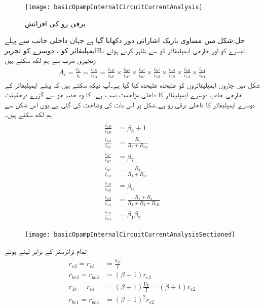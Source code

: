 \begin{figure}
\centering
\texttt{[image: basicOpampInternalCircuitCurrentAnalysis]}
\caption{برقی رو کی افزائش}
\label{شکل_تفرقی_حسابی_برقی_رو_افزائش}
\end{figure}
حل:شکل  میں مساوی باریک اشاراتی دور دکھایا گیا ہے جہاں داخلی جانب سے پہلے ایمپلیفائر کو ، دوسرے کو تحریر{B}، تیسرے کو  اور خارجی ایمپلیفائر کو  سے ظاہر کرتے ہوئے زنجیری ضرب سے ہم لکھ سکتے ہیں
\begin{align}\label{مساوات_تفرقی_ڈارلنگٹن_افزائش_رو_کی_بنیادی_زنجیری_مساوات}
A_i=\frac{i_L}{i_b}=\frac{i_{eD}}{i_{bA}}=\frac{i_{eD}}{i_{bD}} \times \frac{i_{bD}}{i_{cC}} \times \frac{i_{cC}}{i_{bC}} \times \frac{i_{bC}}{i_{cB}} \times \frac{i_{cB}}{i_{bB}} \times \frac{i_{bB}}{i_{cA}} \times \frac{i_{cA}}{i_{bA}}
\end{align}
شکل  میں چاروں ایمپلیفائروں کو علیحدہ علیحدہ کیا گیا ہے۔آپ دیکھ سکتے ہیں کہ پہلے ایمپلیفائر کے خارجی جانب دوسرے ایمپلیفائر کا داخلی مزاحمت  نسب ہے۔ کا وہ حصہ جو  سے گزرے درحقیقت دوسرے ایمپلیفائر کا داخلی برقی رو  ہے۔شکل پر اس بات کی وضاحت کی گئی ہے۔یوں اس شکل سے ہم لکھ سکتے ہیں۔ 
\begin{gather}
\begin{aligned}\label{مساوت_تفرقی_ڈارلنگٹن_تمام_کسر}
\frac{i_{eD}}{i_{bD}}&=\beta_8+1\\
\frac{i_{bD}}{i_{cC}}&=\frac{R_6}{R_6+R_{iD}}\\
\frac{i_{cC}}{i_{bC}}&=\beta_7\\
\frac{i_{bC}}{i_{cB}}&=\frac{R_4}{R_4+R_{iC}}\\
\frac{i_{cB}}{i_{bB}}&=\beta_6\\
\frac{i_{bB}}{i_{cA}}&=\frac{R_1+R_2}{R_1+R_2+R_{iB}}\\
\frac{i_{cA}}{i_{bA}}&= \beta_1 \beta_2
\end{aligned}
\end{gather}
%
\begin{figure}
\centering
\texttt{[image: basicOpampInternalCircuitCurrentAnalysisSectioned]}
\caption{}
\label{شکل_تفرقی_حسابی_برقی_رو_افزائش_الف}
\end{figure}
تمام ٹرانزسٹر کے  برابر لیتے ہوئے
\begin{gather}
\begin{aligned}
r_{e2}=r_{e3}&=\frac{V_T}{I}\\
r_{be2}=r_{be3}&=\left(\beta+1 \right) r_{e2}\\
r_{1e}=r_{e4}&=\left(\beta+1 \right) \frac{V_T}{I} =\left(\beta+1 \right)r_{e2}\\
r_{be1}=r_{be4}&=\left(\beta+1 \right)^2 r_{e2}
\end{aligned}
\end{gather}

